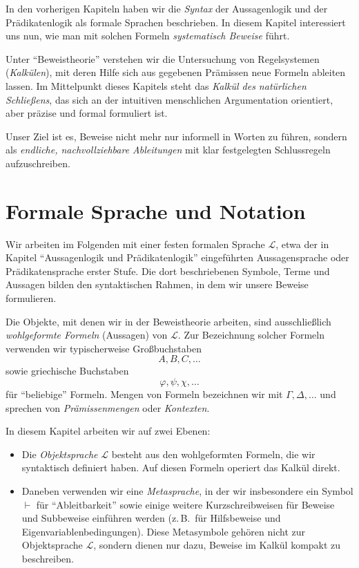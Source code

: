 \documentclass[main.tex]{subfiles}
\begin{document}
In den vorherigen Kapiteln haben wir die \emph{Syntax} der
Aussagenlogik und der Prädikatenlogik als formale Sprachen
beschrieben. In diesem Kapitel interessiert uns nun, wie man mit
solchen Formeln \emph{systematisch Beweise} führt.

Unter \enquote{Beweistheorie} verstehen wir die Untersuchung von
Regelsystemen (\emph{Kalkülen}), mit deren Hilfe sich aus gegebenen
Prämissen neue Formeln ableiten lassen. Im Mittelpunkt dieses
Kapitels steht das \emph{Kalkül des natürlichen Schließens}, das
sich an der intuitiven menschlichen Argumentation orientiert, aber
präzise und formal formuliert ist.

Unser Ziel ist es, Beweise nicht mehr nur informell in Worten zu
führen, sondern als \emph{endliche, nachvollziehbare Ableitungen}
mit klar festgelegten Schlussregeln aufzuschreiben.

\section{Formale Sprache und Notation}

Wir arbeiten im Folgenden mit einer festen formalen Sprache
\(\mathcal L\), etwa der in Kapitel \enquote{Aussagenlogik und
Prädikatenlogik} eingeführten Aussagensprache oder
Prädikatensprache erster Stufe. Die dort beschriebenen Symbole,
Terme und Aussagen bilden den syntaktischen Rahmen, in dem wir
unsere Beweise formulieren.

Die Objekte, mit denen wir in der Beweistheorie arbeiten, sind
ausschließlich \emph{wohlgeformte Formeln} (Aussagen) von
\(\mathcal L\). Zur Bezeichnung solcher Formeln verwenden wir
typischerweise Großbuchstaben
\[
  A,B,C,\dots
\]
sowie griechische Buchstaben
\[
  \varphi,\psi,\chi,\dots
\]
für \enquote{beliebige} Formeln. Mengen von Formeln bezeichnen wir
mit \(\Gamma,\Delta,\dots\) und sprechen von \emph{Prämissenmengen}
oder \emph{Kontexten}.

\begin{remark}
In diesem Kapitel arbeiten wir auf zwei Ebenen:
\begin{itemize}
  \item Die \emph{Objektsprache} \(\mathcal L\) besteht aus den
        wohlgeformten Formeln, die wir syntaktisch definiert haben.
        Auf diesen Formeln operiert das Kalkül direkt.
  \item Daneben verwenden wir eine \emph{Metasprache}, in der wir
        insbesondere ein Symbol \(\vdash\) für \enquote{Ableitbarkeit}
        sowie einige weitere Kurzschreibweisen für Beweise und
        Subbeweise einführen werden (z.\,B.\ für Hilfsbeweise und
        Eigenvariablenbedingungen). Diese Metasymbole gehören nicht zur
        Objektsprache \(\mathcal L\), sondern dienen nur dazu, Beweise
        im Kalkül kompakt zu beschreiben.
\end{itemize}
\end{remark}
\end{document}
